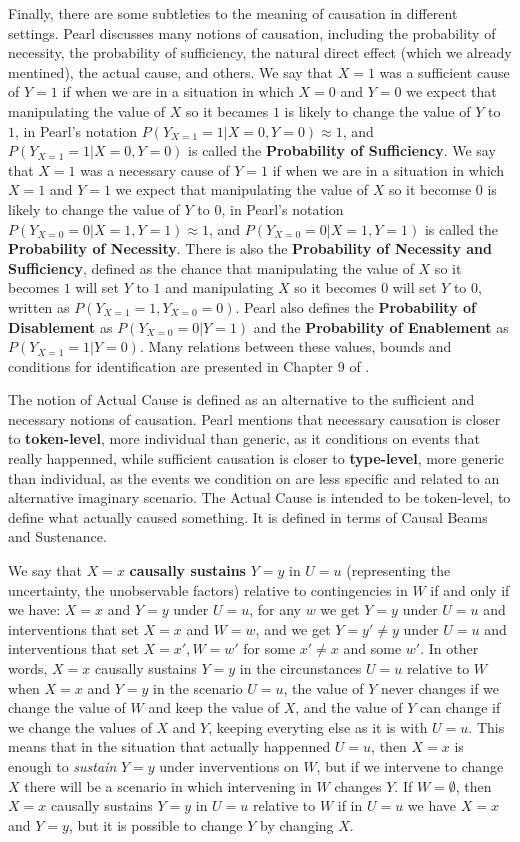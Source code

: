 Finally, there are some subtleties to the meaning of causation in different settings. Pearl discusses many notions of causation, including the probability of necessity, the probability of sufficiency, the natural direct effect (which we already mentined), the actual cause, and others. We say that $X=1$ was a sufficient cause of $Y=1$ if when we are in a situation in which $X=0$ and $Y=0$ we expect that manipulating the value of $X$ so it becames $1$ is likely to change the value of $Y$ to $1$, in Pearl's notation $P(Y_{X=1}=1 | X=0, Y=0) \approx 1$, and $P(Y_{X=1}=1 | X=0, Y=0)$ is called the \textbf{Probability of Sufficiency}. We say that $X=1$ was a necessary cause of $Y=1$ if when we are in a situation in which $X=1$ and $Y=1$ we expect that manipulating the value of $X$ so it becomse $0$ is likely to change the value of $Y$ to $0$, in Pearl's notation $P(Y_{X=0}=0 | X = 1, Y = 1) \approx 1$, and $P(Y_{X=0}=0 | X = 1, Y = 1)$ is called the \textbf{Probability of Necessity}. There is also the \textbf{Probability of Necessity and Sufficiency}, defined as the chance that manipulating the value of $X$ so it becomes $1$ will set $Y$ to $1$ and manipulating $X$ so it becomes $0$ will set $Y$ to $0$, written as $P(Y_{X=1}=1,Y_{X=0}=0)$. Pearl also defines the \textbf{Probability of Disablement} as $P(Y_{X=0}=0|Y=1)$ and the \textbf{Probability of Enablement} as $P(Y_{X=1}=1|Y=0)$. Many relations between these values, bounds and conditions for identification are presented in Chapter $9$ of \cite{Causality}.

The notion of Actual Cause is defined as an alternative to the sufficient and necessary notions of causation. Pearl mentions that necessary causation is closer to \textbf{token-level}, more individual than generic, as it conditions on events that really happenned, while sufficient causation is closer to \textbf{type-level}, more generic than individual, as the events we condition on are less specific and related to an alternative imaginary scenario. The Actual Cause is intended to be token-level, to define what actually caused something. It is defined in terms of Causal Beams and Sustenance. 

We say that $X=x$ \textbf{causally sustains} $Y=y$ in $U=u$ (representing the uncertainty, the unobservable factors) relative to contingencies in $W$ if and only if we have: $X=x$ and $Y=y$ under $U=u$, for any $w$ we get $Y=y$ under $U=u$ and interventions that set $X=x$ and $W=w$, and we get $Y=y' \neq y$ under $U=u$ and interventions that set $X=x',W=w'$ for some $x' \neq x$ and some $w'$. In other words, $X=x$ causally sustains $Y=y$ in the circunstances $U=u$ relative to $W$ when $X=x$ and $Y=y$ in the scenario $U=u$, the value of $Y$ never changes if we change the value of $W$ and keep the value of $X$, and the value of $Y$ can change if we change the values of $X$ and $Y$, keeping everyting else as it is with $U=u$. This means that in the situation that actually happenned $U=u$, then $X=x$ is enough to \textit{sustain} $Y=y$ under inverventions on $W$, but if we intervene to change $X$ there will be a scenario in which intervening in $W$ changes $Y$. If $W=\emptyset$, then $X=x$ causally sustains $Y=y$ in $U=u$ relative to $W$ if in $U=u$ we have $X=x$ and $Y=y$, but it is possible to change $Y$ by changing $X$.

